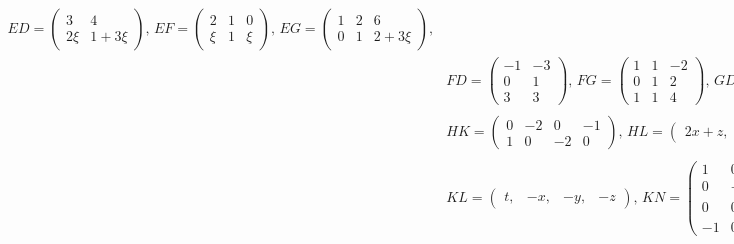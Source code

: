 \documentclass[11pt]{exam}
\begin{document}
\begin{questions}
\begin{solution}
\begin{align*}
		ED=\left(\begin{array}{cc}3&4\\2\xi&1+3\xi\end{array}\right),\,
		EF=\left(\begin{array}{ccc}2&1&0\\\xi&1&\xi\end{array}\right),\,
		EG=\left(\begin{array}{ccc}1&2&6\\0&1&2+3\xi\end{array}\right),\\
		&FD=\left(\begin{array}{cc}-1&-3\\0&1\\3&3\end{array}\right),\,
		FG=\left(\begin{array}{ccc}1&1&-2\\0&1&2\\1&1&4\end{array}\right),\,
		GD=\left(\begin{array}{cc}3&4\\4&7\\6&9\end{array}\right),\,
		GF=\left(\begin{array}{ccc}2&1&0\\2&1&2\\3&0&3\end{array}\right),\\
		&HK=\left(\begin{array}{cccc}0&-2&0&-1\\1&0&-2&0\end{array}\right),\,
		HL=\left(\begin{array}{cc}2x+z,&t+2y\end{array}\right),\,
		HN=\left(\begin{array}{ccc}1&2&2\cos(\gamma)\\1&0&1+2\sin(\gamma)\end{array}\right),\\
		&KL=\left(\begin{array}{cccc}t,&-x,&-y,&-z\end{array}\right),\,
		KN=\left(\begin{array}{ccc}1&0&1\\0&-1&-\cos(\gamma)\\0&0&-\sin(\gamma)\\-1&0&0\end{array}\right),\,
		LM=\left(\begin{array}{cccc}t \tau&t \xi&\eta t&0\\\tau x&x \xi&\eta x&0\\\tau y&\xi y&\eta y&0\\\tau z&\xi z&\eta z&0\end{array}\right),\\

\end{align*}
\end{solution}
\end{questions}
\end{document}
